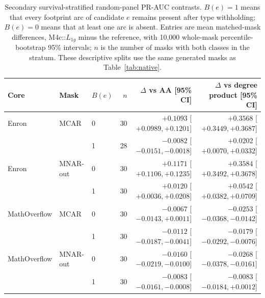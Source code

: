 \documentclass[10pt]{article}
\begin{document}
\begin{table}[H]
\centering
\caption{Secondary survival-stratified random-panel PR-AUC contrasts. $B(e)=1$ means that every footprint arc of candidate $e$ remains present after type withholding; $B(e)=0$ means that at least one arc is absent. Entries are mean matched-mask differences, M4c::$L_{1g}$ minus the reference, with 10,000 whole-mask percentile-bootstrap 95\% intervals; $n$ is the number of masks with both classes in the stratum. These descriptive splits use the same generated masks as Table~\ref{tab:native}.}
\label{tab:survival}
\scriptsize
\setlength{\tabcolsep}{2pt}
\begin{tabular}{@{}lllrrr@{}}
\toprule
Core & Mask & $B(e)$ & $n$ & $\Delta$ vs AA [95\% CI] & $\Delta$ vs degree product [95\% CI]\\
\midrule
Enron & MCAR & 0 & 30 & $+0.1093$ [$+0.0989,+0.1201$] & $+0.3568$ [$+0.3449,+0.3687$]\\
 &  & 1 & 28 & $-0.0082$ [$-0.0151,-0.0018$] & $+0.0202$ [$+0.0070,+0.0332$]\\
Enron & MNAR-out & 0 & 30 & $+0.1171$ [$+0.1106,+0.1235$] & $+0.3584$ [$+0.3492,+0.3678$]\\
 &  & 1 & 30 & $+0.0120$ [$+0.0036,+0.0208$] & $+0.0542$ [$+0.0382,+0.0709$]\\
\addlinespace
MathOverflow & MCAR & 0 & 30 & $-0.0067$ [$-0.0143,+0.0011$] & $-0.0253$ [$-0.0368,-0.0142$]\\
 &  & 1 & 30 & $-0.0112$ [$-0.0187,-0.0041$] & $-0.0179$ [$-0.0292,-0.0076$]\\
MathOverflow & MNAR-out & 0 & 30 & $-0.0160$ [$-0.0219,-0.0100$] & $-0.0268$ [$-0.0378,-0.0161$]\\
 &  & 1 & 30 & $-0.0083$ [$-0.0161,-0.0008$] & $-0.0083$ [$-0.0184,+0.0012$]\\
\bottomrule
\end{tabular}
\end{table}
\end{document}
